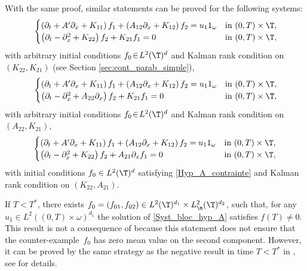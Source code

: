 With the same proof, similar statements can be proved for the following systems:
\begin{equation} \label{Syst_bloc_hyp_K_0}
\begin{cases}
\left(\partial_t +A'\partial_x+K_{11}\right)f_1+\left(A_{12}\partial_x+K_{12}\right)f_2= u_1 1_\omega
&\text{in}\ (0,T)\times \T,\!\\
\left(\partial_t -\partial_x^2+K_{22}\right)f_2 + K_{21} f_1 = 0 &\text{in}\ (0,T)\times \T,\!\\
\end{cases}
\end{equation}
with arbitrary initial conditions $f_0\!\in\!L^2(\T)^d$ and Kalman rank condition on $(K_{22},K_{21})$ (see Section \ref{sec:cont_parab_simple}),
\begin{equation}
\begin{cases}
\left(\partial_t +A'\partial_x+K_{11}\right)f_1+\left(A_{12}\partial_x+K_{12}\right)f_2= u_1 1_\omega
&\text{in}\ (0,T)\times \T,\!\\
\left(\partial_t -\partial_x^2+A_{22} \partial_x \right)f_2 + K_{21} f_1 = 0 &\text{in}\ (0,T)\times \T,\!\\
\end{cases}
\end{equation}
with arbitrary initial conditions $f_0\!\in\!L^2(\T)^d$ and Kalman rank condition on $(A_{22},K_{21})$,%
\begin{equation}\label{Syst_bloc_K_0bis}
\begin{cases}
\left(\partial_t +A'\partial_x+K_{11}\right)f_1+\left(A_{12}\partial_x+K_{12}\right)f_2= u_1 1_\omega
&\text{in}\ (0,T)\times \T,\!\\
\left(\partial_t -\partial_x^2+K_{22} \right)f_2 + A_{21} \partial_x f_1 = 0 &\text{in}\ (0,T)\times \T,
\end{cases}
\end{equation}
with initial conditions $f_0 \in L^2(\T)^d$ satisfying \eqref{Hyp_A_contrainte} and Kalman rank condition on $(K_{22},A_{21})$.

If $T<T^*$, there exists $f_0=(f_{01},f_{02})\in L^2(\T)^{d_1} \times L^2_\m(\T)^{d_2}$, such that, for any \hbox{$u_1 \in L^2((0,T)\times\omega)^{d_1}$} the solution of \eqref{Syst_bloc_hyp_A} satisfies $f(T) \neq 0$. This result is not a consequence of  because this statement does not ensure that the counter-example~$f_0$ has zero mean value on the second component. However, it can be proved by the same strategy as the negative result in time $T<T^*$ in , see  for details.

